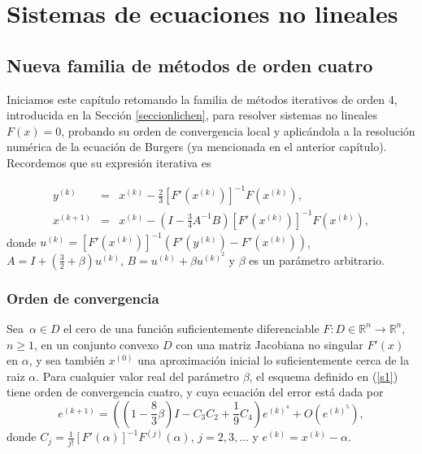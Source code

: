 
\chapter{Sistemas de ecuaciones no lineales}\label{capitulosistemas}

\section{Nueva familia de métodos de orden cuatro}\label{seccionlichensistemas}

Iniciamos este capítulo retomando la familia de métodos iterativos de orden 4, introducida en la Sección \ref{seccionlichen}, para resolver sistemas no lineales $F(x)=0$, probando su orden de convergencia local y aplicándola a la resolución numérica de la ecuación de Burgers (ya mencionada en el anterior capítulo). Recordemos que su expresión iterativa es

\begin{eqnarray}\label{s1}
y^{(k)} &=& x^{(k)} - \frac{2}{3}[F'(x^{(k)})]^{-1}F(x^{(k)}),\nonumber\\
x^{(k + 1)}& =& x^{(k)} - \left(I - \frac{3}{4}A^{-1}
B\right)[F'(x^{(k)})]^{-1}F(x^{(k)}),
\end{eqnarray}
donde $u ^{(k)} = [F'(x^{(k)})]^{-1}\left(F'(y^{(k)}) -
F'(x^{(k)})\right)$, $A= I + (\frac{3}{2} + \beta )u^{(k)}$,
$B=u^{(k)} + \beta u^{(k)^2}$ y $\beta$ es un parámetro arbitrario.

\subsection{Orden de convergencia}
\begin{theorem}
	Sea\ $\alpha\in D$  el cero de una función suficientemente diferenciable $F:D \in \mathbb{R}^n \rightarrow \mathbb{R}^n$, $n\geq 1$,
	en un conjunto convexo $D$ con una matriz Jacobiana no singular $F'(x)$ en $\alpha$, y sea también $x^{(0)}$ una aproximación inicial lo suficientemente cerca de la raiz $\alpha$.
	Para cualquier valor real del parámetro $\beta$, el esquema definido en
	(\ref{s1}) tiene orden de convergencia cuatro, y cuya ecuación del error está dada por
	\begin{equation*}%
	e^{(k + 1)} = \left( \left(1 - \frac{8}{3}\beta\right)I  - {C_3}{C_2} +
	\frac{1}{9}{C_4}\right) e^{(k)^4} + O(e^{(k)^5}),
	\end{equation*}
	donde $C_j = \frac{1}{j!}[F'(\alpha )]^{ - 1}F^{(j)}(\alpha )$, $j =
	2,3,\ldots$ y ${e^{(k)}} = x^{(k)} - \alpha$.
\end{theorem}

